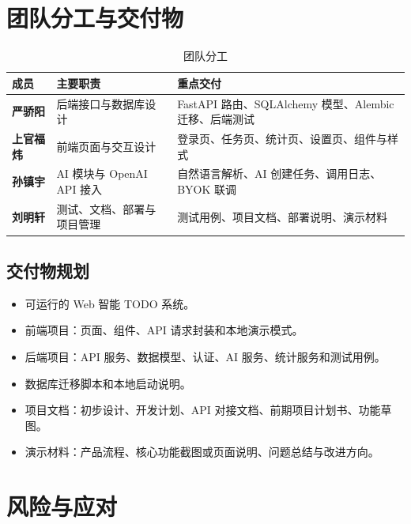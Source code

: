 \documentclass[UTF8,a4paper,12pt,fontset=fandol]{ctexart}
\begin{document}
\section{团队分工与交付物}

\begin{table}[H]
  \centering
  \caption{团队分工}
  \begin{tabularx}{\linewidth}{>{\bfseries}p{2.5cm}YY}
    \toprule
    成员 & 主要职责 & 重点交付 \\
    \midrule
    严骄阳 & 后端接口与数据库设计 & FastAPI 路由、SQLAlchemy 模型、Alembic 迁移、后端测试 \\
    上官福炜 & 前端页面与交互设计 & 登录页、任务页、统计页、设置页、组件与样式 \\
    孙镇宇 & AI 模块与 OpenAI API 接入 & 自然语言解析、AI 创建任务、调用日志、BYOK 联调 \\
    刘明轩 & 测试、文档、部署与项目管理 & 测试用例、项目文档、部署说明、演示材料 \\
    \bottomrule
  \end{tabularx}
\end{table}

\subsection{交付物规划}

\begin{itemize}
  \item 可运行的 Web 智能 TODO 系统。
  \item 前端项目：页面、组件、API 请求封装和本地演示模式。
  \item 后端项目：API 服务、数据模型、认证、AI 服务、统计服务和测试用例。
  \item 数据库迁移脚本和本地启动说明。
  \item 项目文档：初步设计、开发计划、API 对接文档、前期项目计划书、功能草图。
  \item 演示材料：产品流程、核心功能截图或页面说明、问题总结与改进方向。
\end{itemize}

\section{风险与应对}
\end{document}
